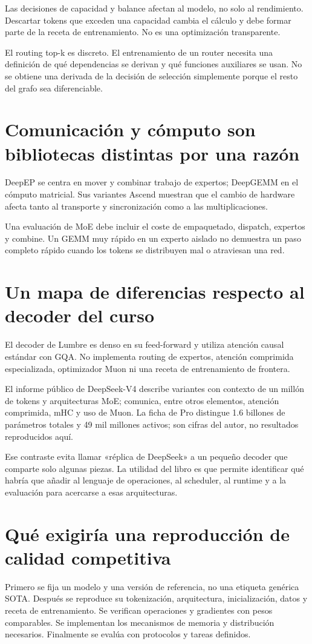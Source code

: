 \documentclass[12pt,a4paper,oneside]{report}
\begin{document}
Las decisiones de capacidad y balance afectan al modelo, no solo al rendimiento. Descartar tokens que exceden una capacidad cambia el cálculo y debe formar parte de la receta de entrenamiento. No es una optimización transparente.

El routing top-k es discreto. El entrenamiento de un router necesita una definición de qué dependencias se derivan y qué funciones auxiliares se usan. No se obtiene una derivada de la decisión de selección simplemente porque el resto del grafo sea diferenciable.

\section{Comunicación y cómputo son bibliotecas distintas por una razón}
DeepEP se centra en mover y combinar trabajo de expertos; DeepGEMM en el cómputo matricial. Sus variantes Ascend muestran que el cambio de hardware afecta tanto al transporte y sincronización como a las multiplicaciones. \cite{deepep,deepgemm,deepep-ascend,deepgemm-ascend}

Una evaluación de MoE debe incluir el coste de empaquetado, dispatch, expertos y combine. Un GEMM muy rápido en un experto aislado no demuestra un paso completo rápido cuando los tokens se distribuyen mal o atraviesan una red.

\section{Un mapa de diferencias respecto al decoder del curso}
El decoder de Lumbre es denso en su feed-forward y utiliza atención causal estándar con GQA. No implementa routing de expertos, atención comprimida especializada, optimizador Muon ni una receta de entrenamiento de frontera.

El informe público de DeepSeek-V4 describe variantes con contexto de un millón de tokens y arquitecturas MoE; comunica, entre otros elementos, atención comprimida, mHC y uso de Muon. La ficha de Pro distingue 1.6 billones de parámetros totales y 49 mil millones activos; son cifras del autor, no resultados reproducidos aquí. \cite{deepseek-v4}

Ese contraste evita llamar «réplica de DeepSeek» a un pequeño decoder que comparte solo algunas piezas. La utilidad del libro es que permite identificar qué habría que añadir al lenguaje de operaciones, al scheduler, al runtime y a la evaluación para acercarse a esas arquitecturas.

\section{Qué exigiría una reproducción de calidad competitiva}
Primero se fija un modelo y una versión de referencia, no una etiqueta genérica SOTA. Después se reproduce su tokenización, arquitectura, inicialización, datos y receta de entrenamiento. Se verifican operaciones y gradientes con pesos comparables. Se implementan los mecanismos de memoria y distribución necesarios. Finalmente se evalúa con protocolos y tareas definidos.
\end{document}
